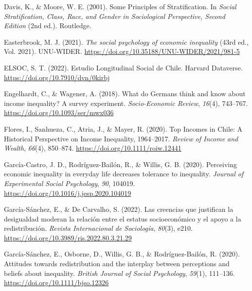 \documentclass[
  12pt,
]{article}
\newlength{\cslhangindent}
\newlength{\cslentryspacingunit} %
\newenvironment{CSLReferences}[2] %
 {%
  \setlength{\parindent}{0pt}
  \ifodd #1
  \let\oldpar\par
  \def\par{\hangindent=\cslhangindent\oldpar}
  \fi
  \setlength{\parskip}{#2\cslentryspacingunit}
 }%
 {}
\begin{document}
\begin{CSLReferences}{1}{0}
\leavevmode{}%
Davis, K., \& Moore, W. E. (2001). Some {Principles} of
{Stratification}. In \emph{Social {Stratification}, {Class}, {Race}, and
{Gender} in {Sociological Perspective}, {Second Edition}} (2nd ed.).
Routledge.

\leavevmode{}%
Easterbrook, M. J. (2021). \emph{The social psychology of economic
inequality} (43rd ed., Vol. 2021). UNU-WIDER.
\url{https://doi.org/10.35188/UNU-WIDER/2021/981-5}

\leavevmode{}%
ELSOC, S. T. (2022). Estudio {Longitudinal Social} de {Chile}. Harvard
Dataverse. \url{https://doi.org/10.7910/dvn/0kirbj}

\leavevmode{}%
Engelhardt, C., \& Wagener, A. (2018). What do {Germans} think and know
about income inequality? {A} survey experiment. \emph{Socio-Economic
Review}, \emph{16}(4), 743--767.
\url{https://doi.org/10.1093/ser/mwx036}

\leavevmode{}%
Flores, I., Sanhueza, C., Atria, J., \& Mayer, R. (2020). Top {Incomes}
in {Chile}: {A Historical Perspective} on {Income Inequality},
1964--2017. \emph{Review of Income and Wealth}, \emph{66}(4), 850--874.
\url{https://doi.org/10.1111/roiw.12441}

\leavevmode{}%
García-Castro, J. D., Rodríguez-Bailón, R., \& Willis, G. B. (2020).
Perceiving economic inequality in everyday life decreases tolerance to
inequality. \emph{Journal of Experimental Social Psychology}, \emph{90},
104019. \url{https://doi.org/10.1016/j.jesp.2020.104019}

\leavevmode{}%
García-Sánchez, E., \& De Carvalho, S. (2022). Las creencias que
justifican la desigualdad moderan la relaci{ó}n entre el estatus
socioecon{ó}mico y el apoyo a la redistribuci{ó}n. \emph{Revista
Internacional de Sociolog{í}a}, \emph{80}(3), e210.
\url{https://doi.org/10.3989/ris.2022.80.3.21.29}

\leavevmode{}%
García-Sánchez, E., Osborne, D., Willis, G. B., \& Rodríguez-Bailón, R.
(2020). Attitudes towards redistribution and the interplay between
perceptions and beliefs about inequality. \emph{British Journal of
Social Psychology}, \emph{59}(1), 111--136.
\url{https://doi.org/10.1111/bjso.12326}


\end{CSLReferences}
\end{document}
